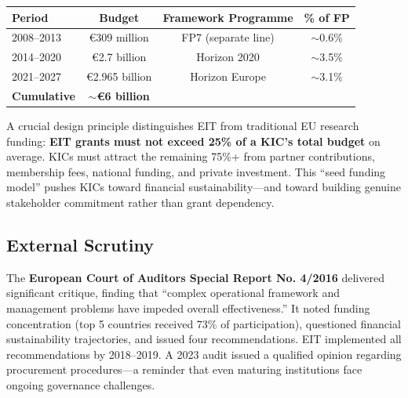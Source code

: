 \documentclass[../main.tex]{subfiles}
\begin{document}
\tableminimal
\begin{center}
\begin{tabular}{@{}lccc@{}}
\toprule
\textbf{Period} & \textbf{Budget} & \textbf{Framework Programme} & \textbf{\% of FP} \\
\midrule
2008--2013 & €309 million & FP7 (separate line) & $\sim$0.6\% \\
2014--2020 & €2.7 billion & Horizon 2020 & $\sim$3.5\% \\
2021--2027 & €2.965 billion & Horizon Europe & $\sim$3.1\% \\
\midrule
\textbf{Cumulative} & \textbf{$\sim$€6 billion} & & \\
\bottomrule
\end{tabular}
\end{center}

A crucial design principle distinguishes EIT from traditional EU research funding: \textbf{EIT grants must not exceed 25\% of a KIC's total budget} on average. KICs must attract the remaining 75\%+ from partner contributions, membership fees, national funding, and private investment. This ``seed funding model'' pushes KICs toward financial sustainability---and toward building genuine stakeholder commitment rather than grant dependency.

\subsection*{External Scrutiny}

The \textbf{European Court of Auditors Special Report No. 4/2016} delivered significant critique, finding that ``complex operational framework and management problems have impeded overall effectiveness.'' It noted funding concentration (top 5 countries received 73\% of participation), questioned financial sustainability trajectories, and issued four recommendations. EIT implemented all recommendations by 2018--2019. A 2023 audit issued a qualified opinion regarding procurement procedures---a reminder that even maturing institutions face ongoing governance challenges.


\end{document}
